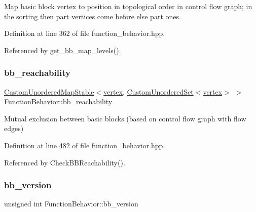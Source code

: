 Map basic block vertex to position in topological order in control flow graph; in the sorting then part vertices come before else part ones. 



Definition at line 362 of file function\+\_\+behavior.\+hpp.



Referenced by get\+\_\+bb\+\_\+map\+\_\+levels().

\mbox{\label{classFunctionBehavior_aab2576b9f84ed141a041f258ee41edff}} 
\subsubsection{\texorpdfstring{bb\+\_\+reachability}{bb\_reachability}}
{\footnotesize\ttfamily \hyperlink{custom__map_8hpp_a7314a7df1cdb3a3acf478ab86e95c226}{Custom\+Unordered\+Map\+Stable}$<$\hyperlink{graph_8hpp_abefdcf0544e601805af44eca032cca14}{vertex}, \hyperlink{classCustomUnorderedSet}{Custom\+Unordered\+Set}$<$\hyperlink{graph_8hpp_abefdcf0544e601805af44eca032cca14}{vertex}$>$ $>$ Function\+Behavior\+::bb\+\_\+reachability}



Mutual exclusion between basic blocks (based on control flow graph with flow edges) 



Definition at line 482 of file function\+\_\+behavior.\+hpp.



Referenced by Check\+B\+B\+Reachability().

\mbox{\label{classFunctionBehavior_a11bef5db9582106abc6aef23183af306}} 
\subsubsection{\texorpdfstring{bb\+\_\+version}{bb\_version}}
{\footnotesize\ttfamily unsigned int Function\+Behavior\+::bb\+\_\+version\hspace{0.3cm}{\ttfamily [private]}}



